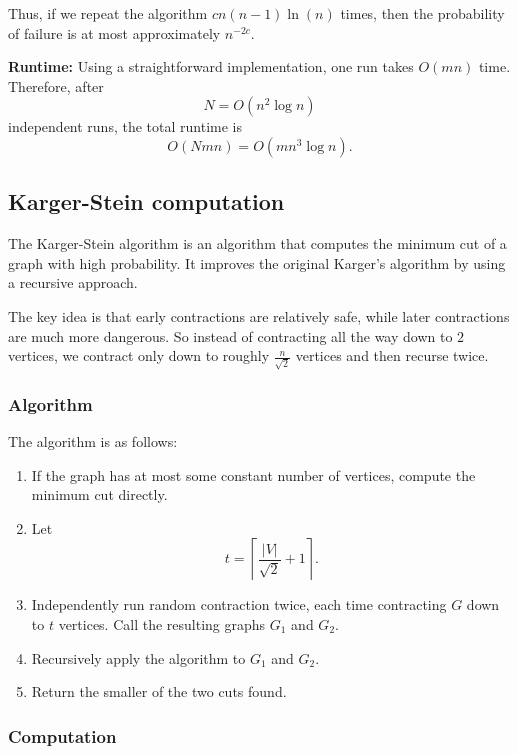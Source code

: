 \documentclass[14pt]{extreport}
\begin{document}
    Thus, if we repeat the algorithm $cn(n - 1)\ln(n)$ times, then the probability of failure is at most approximately $n^{-2c}$.

    \vspace{4mm}

    \textbf{Runtime:} Using a straightforward implementation, one run takes $O(mn)$ time. Therefore, after
    $$
    N = O(n^2 \log n)
    $$
    independent runs, the total runtime is
    $$
    O(Nmn) = O(mn^3 \log n).
    $$

\subsection*{Karger-Stein computation}

    The Karger-Stein algorithm is an algorithm that computes the minimum cut of a graph with high probability. It improves the original Karger's algorithm by using a recursive approach.

    \vspace{4mm}

    The key idea is that early contractions are relatively safe, while later contractions are much more dangerous. So instead of contracting all the way down to $2$ vertices, we contract only down to roughly $\frac{n}{\sqrt{2}}$ vertices and then recurse twice.

\subsubsection*{Algorithm}
    The algorithm is as follows:

    \begin{enumerate}
        \item If the graph has at most some constant number of vertices, compute the minimum cut directly.
        \item Let
        $$
        t = \left\lceil \frac{|V|}{\sqrt{2}} + 1 \right\rceil.
        $$
        \item Independently run random contraction twice, each time contracting $G$ down to $t$ vertices. Call the resulting graphs $G_1$ and $G_2$.
        \item Recursively apply the algorithm to $G_1$ and $G_2$.
        \item Return the smaller of the two cuts found.
    \end{enumerate}

\subsubsection*{Computation}
\end{document}
